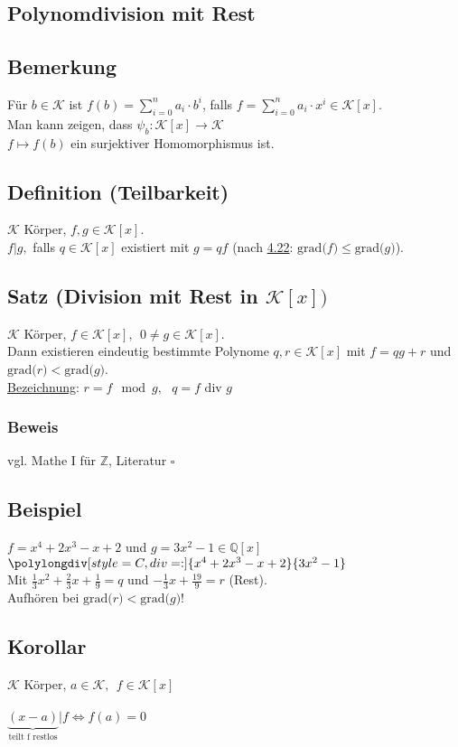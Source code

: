 \documentclass[a4paper, 12pt,titlepage, pdf, headsepline]{scrartcl}
\newcommand{\grad}[1]{\textrm{grad(}#1\textrm{)}}
\newcommand{\K}{\mathcal{K}}
\newcommand{\uline}[1]{\underline{#1}}
\newcommand{\qed}{\hfill$\square$}
\renewcommand{\>}{\rightarrow}
\renewcommand{\*}{\cdot}
\begin{document}
		      	\subsection*{Polynomdivision mit Rest}
		      	\subsection{Bemerkung}
		      	Für $b \in \K$ ist $f(b) = \sum_{i = 0}^{n} a_i \cdot b^i$, falls $f = \sum_{i = 0}^{n} a_i \cdot x^i \in \K[x]$.\\
		      	Man kann zeigen, dass $\psi_b : \K[x] \rightarrow \K$\\
		      	\noindent\hspace*{52mm}$ f \mapsto f(b)$ ein surjektiver Homomorphismus ist.
		      	\subsection{Definition (Teilbarkeit)}
		      	$\K$ Körper, $f,g \in \K[x].$\\$ f \vert g,$ falls $q \in \K[x]$ existiert mit $g = qf$ (nach \hyperref[4.22]{4.22}: $\grad{f}\leq\grad{g}$).
		      	\subsection{Satz (Division mit Rest in $\K[x])$}
		      	$\K$ Körper, $f \in \K[x], ~~0 \neq g \in \K[x]$.\\
		      	Dann existieren eindeutig bestimmte Polynome $q,r \in \K[x]$ mit $f = qg + r$ und $\grad{r}<\grad{g}$.\\
		      	\uline{Bezeichnung}: $r = f \mod g,~~~ q = f \text{ div } g$
		      	\subsubsection*{Beweis}
		      	vgl. Mathe I für $\mathds{Z}$, Literatur \qed
		      	\subsection{Beispiel}
		      	$f = x^4 + 2x^3 - x +2$ und $ g = 3x^2-1 \in \mathds{Q}[x]$\\
		      	$\polylongdiv[style=C, div=:]{x^4+2x^3-x+2}{3x^2-1}$\\
		      	Mit $\frac{1}{3}x^2+\frac{2}{3}x+\frac{1}{9}=q$ und $-\frac{1}{3}x+\frac{19}{9}=r$ (Rest).\\
		      	Aufhören bei $\grad{r}<\grad{g}$!
		      	\subsection{Korollar}
		      	$\K$ Körper, $a \in \K,~~ f \in \K[x]$\\
		      	\\
		      	$\underbrace{(x -a)}_{\textrm{teilt f restlos}}\vert f \Leftrightarrow f(a) = 0$
\end{document}
